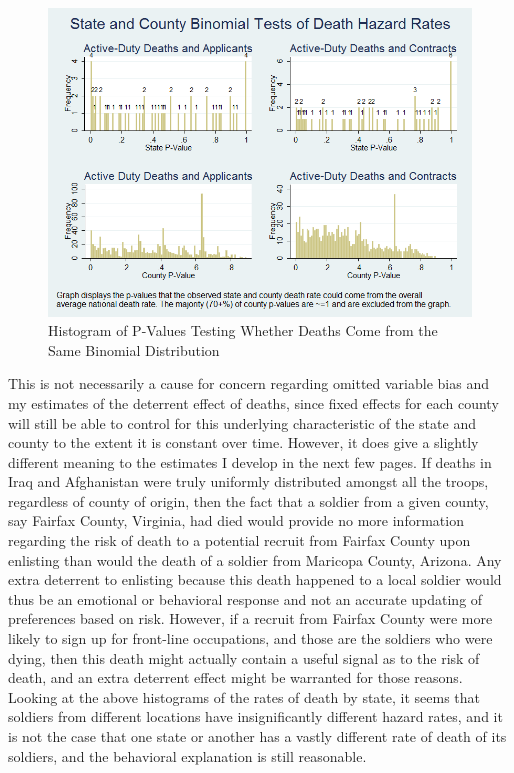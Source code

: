 \documentclass[12pt] {article}
\begin{document}
\begin{figure}
\includegraphics[scale=0.5]{../Output/hist_binomial_combined.png}
\caption{Histogram of P-Values Testing Whether Deaths Come from the
Same Binomial Distribution}
\label{Flo:Pat's Histo}
\end{figure}
\clearpage{}

This is not necessarily a cause for concern regarding omitted variable bias and my estimates of the deterrent effect of deaths,
since fixed effects for each county will still be able to control for this underlying characteristic of the state and county to the extent it is constant over time. However, it does give a slightly different meaning to the estimates I develop in the next few pages. If deaths in Iraq and Afghanistan were truly uniformly
distributed amongst all the troops, regardless of county of origin, then the fact that a soldier from a given county, say Fairfax
County, Virginia, had died would provide no more information regarding
the risk of death to a potential recruit from Fairfax County upon
enlisting than would the death of a soldier from Maricopa County,
Arizona. Any extra deterrent to enlisting because this death happened to a local soldier would thus be an emotional or behavioral response and not
an accurate updating of preferences based on risk. However, if a recruit
from Fairfax County were more likely to sign up for front-line occupations,
and those are the soldiers who were dying, then this death might actually
contain a useful signal as to the risk of death, and an extra deterrent
effect might be warranted for those reasons. Looking at the above
histograms of the rates of death by state, it seems that soldiers
from different locations have insignificantly different hazard rates, and
it is not the case that one state or another has a vastly different
rate of death of its soldiers, and the behavioral explanation is still reasonable.
\end{document}
